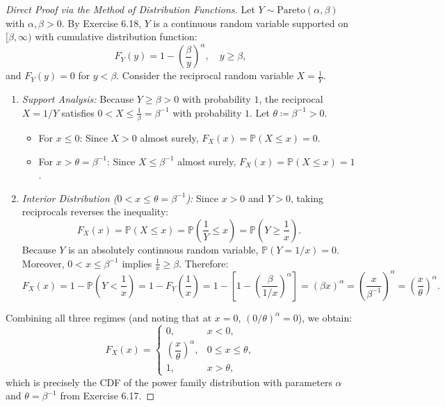 \documentclass[11pt, letterpaper]{article}
\theoremstyle{definition}
\theoremstyle{remark}
\newcommand{\Prob}{\mathbb{P}}
\begin{document}
\begin{proof}[Direct Proof via the Method of Distribution Functions]
Let $Y \sim \text{Pareto}(\alpha, \beta)$ with $\alpha, \beta > 0$. By Exercise 6.18, $Y$ is a continuous random variable supported on $[\beta, \infty)$ with cumulative distribution function:
\[
    F_Y(y) = 1 - \left(\frac{\beta}{y}\right)^\alpha, \quad y \ge \beta,
\]
and $F_Y(y) = 0$ for $y < \beta$. Consider the reciprocal random variable $X = \frac{1}{Y}$.
\begin{enumerate}
    \item \textit{Support Analysis:} Because $Y \ge \beta > 0$ with probability $1$, the reciprocal $X = 1/Y$ satisfies $0 < X \le \frac{1}{\beta} = \beta^{-1}$ with probability $1$. Let $\theta \coloneqq \beta^{-1} > 0$.
    \begin{itemize}
        \item For $x \le 0$: Since $X > 0$ almost surely, $F_X(x) = \Prob(X \le x) = 0$.
        \item For $x > \theta = \beta^{-1}$: Since $X \le \beta^{-1}$ almost surely, $F_X(x) = \Prob(X \le x) = 1$.
    \end{itemize}
    \item \textit{Interior Distribution ($0 < x \le \theta = \beta^{-1}$):} Since $x > 0$ and $Y > 0$, taking reciprocals reverses the inequality:
    \[
        F_X(x) = \Prob(X \le x) = \Prob\left(\frac{1}{Y} \le x\right) = \Prob\left(Y \ge \frac{1}{x}\right).
    \]
    Because $Y$ is an absolutely continuous random variable, $\Prob(Y = 1/x) = 0$. Moreover, $0 < x \le \beta^{-1}$ implies $\frac{1}{x} \ge \beta$. Therefore:
    \[
        F_X(x) = 1 - \Prob\left(Y < \frac{1}{x}\right) = 1 - F_Y\left(\frac{1}{x}\right) = 1 - \left[ 1 - \left(\frac{\beta}{1/x}\right)^\alpha \right] = (\beta x)^\alpha = \left(\frac{x}{\beta^{-1}}\right)^\alpha = \left(\frac{x}{\theta}\right)^\alpha.
    \]
\end{enumerate}
Combining all three regimes (and noting that at $x = 0$, $(0/\theta)^\alpha = 0$), we obtain:
\[
    F_X(x) = \begin{cases} 0, & x < 0, \\ \left(\dfrac{x}{\theta}\right)^\alpha, & 0 \le x \le \theta, \\[8pt] 1, & x > \theta, \end{cases}
\]
which is precisely the CDF of the power family distribution with parameters $\alpha$ and $\theta = \beta^{-1}$ from Exercise 6.17.
\end{proof}
\end{document}
